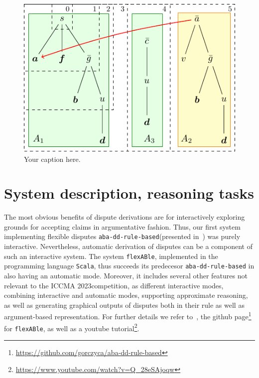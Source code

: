 \documentclass[conference]{IEEEtran}
\newcommand{\abaddrule}{\texttt{aba-dd-rule-based}\xspace}
\newcommand{\flexable}{\texttt{flexABle}\xspace}
\newcommand{\scala}{\texttt{Scala}\xspace}
\newcommand{\iccma}{ICCMA 2023}
\begin{document}
\begin{figure}
    \centering
      \centering
      \includegraphics[scale=0.8]{../diagrams/diagram.pdf}
      \caption{Your caption here.}

    \label{fig:diagrams}
  \end{figure}




\section{System description, reasoning tasks}

The most obvious benefits of dispute derivations are for interactively exploring grounds for accepting claims in argumentative fashion.  Thus, our first system implementing flexible disputes \abaddrule (presented in~\cite{DillerGG21}) was purely interactive.  Nevertheless, automatic derivation of disputes can be a component of such an interactive system. The system \flexable, implemented in the programming language \scala, thus succeeds its predecesor \abaddrule in also having an automatic mode. Moreover, it includes several other features not relevant to the \iccma competition, as different interactive modes, combining interactive and automatic modes, supporting approximate reasoning, as well as generating graphical outputs of disputes both in their rule as well as argument-based representation.  For further details we refer to~\cite{gor22}, the github page\footnote{\url{https://github.com/gorczyca/aba-dd-rule-based}} for \flexable, as well as a youtube tutorial\footnote{\url{https://www.youtube.com/watch?v=Q_28eSAjoqw}}.
\end{document}
